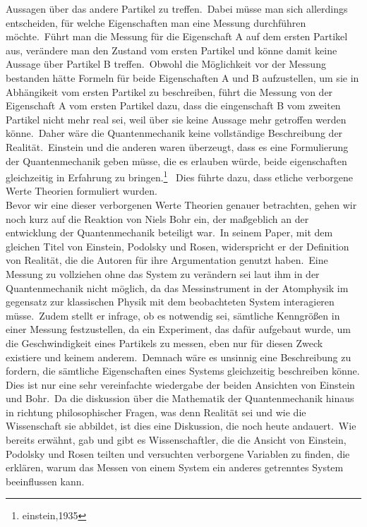 Aussagen über das andere Partikel zu treffen.\ Dabei müsse man sich allerdings entscheiden, für welche Eigenschaften man eine Messung durchführen möchte.\ Führt man die Messung für die Eigenschaft A auf dem ersten Partikel aus, verändere man den Zustand vom ersten Partikel und könne damit keine Aussage über Partikel
B treffen.\ Obwohl die Möglichkeit vor der Messung bestanden hätte Formeln für beide Eigenschaften A und B aufzustellen, um sie in Abhängikeit vom ersten Partikel zu beschreiben, führt die Messung von der Eigenschaft A vom ersten Partikel dazu, dass die eingenschaft B vom zweiten Partikel nicht mehr real sei, weil über sie
keine Aussage mehr getroffen werden könne.\ Daher wäre die Quantenmechanik keine vollständige Beschreibung der Realität.\ Einstein und die anderen waren überzeugt, dass es eine Formulierung der Quantenmechanik geben müsse, die es erlauben würde, beide eigenschaften gleichzeitig in Erfahrung zu bringen.\footnote{einstein,1935}
\ Dies führte dazu, dass etliche verborgene Werte Theorien formuliert wurden. \\

Bevor wir eine dieser verborgenen Werte Theorien genauer betrachten, gehen wir noch kurz auf die Reaktion von Niels Bohr ein, der maßgeblich an der entwicklung der Quantenmechanik beteiligt war.\
In seinem Paper, mit dem gleichen Titel von Einstein, Podolsky und Rosen, widerspricht er der Definition von Realität, die die Autoren für ihre Argumentation genutzt haben.\ Eine Messung zu vollziehen
ohne das System zu verändern sei laut ihm in der Quantenmechanik nicht möglich, da das Messinstrument in der Atomphysik im gegensatz zur klassischen Physik mit dem beobachteten System interagieren müsse.\
Zudem stellt er infrage, ob es notwendig sei, sämtliche Kenngrößen in einer Messung festzustellen, da ein Experiment, das dafür aufgebaut wurde, um die Geschwindigkeit eines Partikels zu messen, eben nur für diesen Zweck
existiere und keinem anderem.\ Demnach wäre es unsinnig eine Beschreibung zu fordern, die sämtliche Eigenschaften eines Systems gleichzeitig beschreiben könne.\\
Dies ist nur eine sehr vereinfachte wiedergabe der beiden Ansichten von Einstein und Bohr.\ Da die diskussion über die Mathematik der Quantenmechanik hinaus in richtung philosophischer Fragen, was denn Realität sei und wie die Wissenschaft sie abbildet, ist dies
eine Diskussion, die noch heute andauert.\ Wie bereits erwähnt, gab und gibt es Wissenschaftler, die die Ansicht von Einstein, Podolsky und Rosen teilten und versuchten verborgene Variablen zu finden, die erklären, warum das Messen von einem System ein anderes getrenntes System beeinflussen kann.\\




